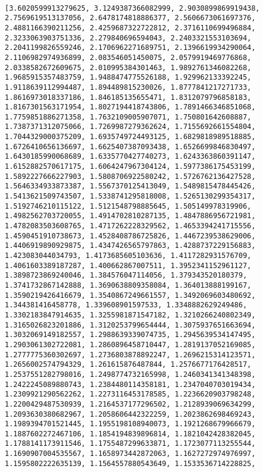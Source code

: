 \documentclass[11pt]{article}
\begin{document}
    \begin{center}
    \end{center}
    { \hspace*{\fill} \\}
    
    \begin{Verbatim}[commandchars=\\\{\}]
[3.6020599913279625, 3.1249387366082999, 2.9030899869919438, 2.7569619513137056, 2.6478174818886377, 2.5606673061697376, 2.4881166390211256, 2.4259687322722812, 2.3716110699496884, 2.3233063903751336, 2.279840696594043, 2.2403321553103694, 2.2041199826559246, 2.1706962271689751, 2.1396619934290064, 2.1106982974936899, 2.083546051450075, 2.0579919469776868, 2.0338582672609675, 2.010995384301463, 1.9892761346082268, 1.9685915357483759, 1.9488474775526188, 1.929962133392245, 1.9118639112994487, 1.894489815230026, 1.8777841217271733, 1.8616973018337186, 1.846185135655471, 1.8312079796858183, 1.8167301563171954, 1.8027194418743806, 1.7891466346851068, 1.7759851886271358, 1.7632109005907071, 1.750801642608887, 1.7387371312075066, 1.7269987279362624, 1.7155692661554804, 1.7044329000375209, 1.6935749724493125, 1.6829818989518885, 1.6726410656136697, 1.6625407387093438, 1.6526699846830497, 1.6430185990068689, 1.6335770427740273, 1.6243363860391147, 1.6152882570617175, 1.6064247967304124, 1.5977386175453199, 1.5892227666227903, 1.5808706922580242, 1.5726762136427528, 1.5646334933873387, 1.5567370125413049, 1.5489815478445426, 1.5413621509743507, 1.5338741295818008, 1.5265130299354317, 1.5192746210115122, 1.5121548798885645, 1.505149978319906, 1.4982562703720055, 1.4914702810287135, 1.4847886956721981, 1.4782083503608765, 1.4717262228329562, 1.4653394241715556, 1.4590451910738673, 1.4528408786725826, 1.4467239538629006, 1.4406919890929875, 1.4347426565797863, 1.4288737229156883, 1.423083044034793, 1.4173685605103636, 1.4117282931576709, 1.4061603389187287, 1.400662867007511, 1.3952341152961127, 1.3898723869240046, 1.384576047114056, 1.379343520180379, 1.3741732867142888, 1.3690638809358084, 1.364013888199167, 1.3590219426416679, 1.3540867249661557, 1.3492069603480692, 1.344381416458778, 1.339608901597533, 1.3348882629249486, 1.3302183847914635, 1.3255981871547182, 1.3210266240802349, 1.3165026823201886, 1.3120253799654444, 1.3075937651663694, 1.3032069149182557, 1.2988639339074735, 1.2945639534147495, 1.2903061302722081, 1.2860896458710447, 1.2819137052169085, 1.2777775360302697, 1.2736803878892247, 1.2696215314123571, 1.2656002574794329, 1.261615876487844, 1.2576677176428517, 1.2537551282798016, 1.2498774732165998, 1.2460341341348398, 1.2422245089880743, 1.2384480114358181, 1.2347040703019434, 1.2309921290562262, 1.2273116453178585, 1.2236620903798248, 1.2200429487530939, 1.2164537177296502, 1.2128939069634299, 1.2093630380682967, 1.2058606442322259, 1.2023862698469243, 1.1989394701521445, 1.1955198108940073, 1.1921268679966679, 1.1887602272467106, 1.1854194839896814, 1.1821042428382045, 1.1788141173911546, 1.1755487299633871, 1.1723077113255544, 1.1690907004535567, 1.1658973442872063, 1.1627272974976997, 1.1595802222635139, 1.1564557880543649, 1.1533536714228825, 
\end{Verbatim}
\end{document}
